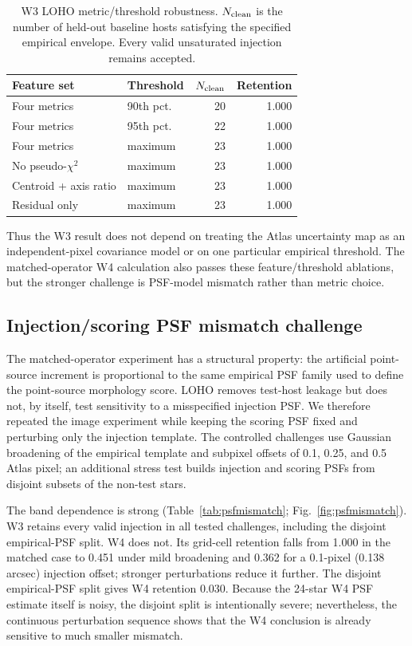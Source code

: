 \documentclass[fleqn,usenatbib]{mnras}
\begin{document}
\begin{table}
\centering
\caption{W3 LOHO metric/threshold robustness. $N_{\rm clean}$ is the number of held-out baseline hosts satisfying the specified empirical envelope. Every valid unsaturated injection remains accepted.}
\label{tab:ablation}
\begin{tabular}{llrr}
\toprule
Feature set & Threshold & $N_{\rm clean}$ & Retention\\
\midrule
Four metrics & 90th pct. & 20 & 1.000\\
Four metrics & 95th pct. & 22 & 1.000\\
Four metrics & maximum & 23 & 1.000\\
No pseudo-$\chi^2$ & maximum & 23 & 1.000\\
Centroid + axis ratio & maximum & 23 & 1.000\\
Residual only & maximum & 23 & 1.000\\
\bottomrule
\end{tabular}
\end{table}

Thus the W3 result does not depend on treating the Atlas uncertainty map as an independent-pixel covariance model or on one particular empirical threshold. The matched-operator W4 calculation also passes these feature/threshold ablations, but the stronger challenge is PSF-model mismatch rather than metric choice.

\subsection{Injection/scoring PSF mismatch challenge}
\label{sec:psf_mismatch}

The matched-operator experiment has a structural property: the artificial point-source increment is proportional to the same empirical PSF family used to define the point-source morphology score. LOHO removes test-host leakage but does not, by itself, test sensitivity to a misspecified injection PSF. We therefore repeated the image experiment while keeping the scoring PSF fixed and perturbing only the injection template. The controlled challenges use Gaussian broadening of the empirical template and subpixel offsets of 0.1, 0.25, and 0.5 Atlas pixel; an additional stress test builds injection and scoring PSFs from disjoint subsets of the non-test stars.

The band dependence is strong (Table~\ref{tab:psfmismatch}; Fig.~\ref{fig:psfmismatch}). W3 retains every valid injection in all tested challenges, including the disjoint empirical-PSF split. W4 does not. Its grid-cell retention falls from 1.000 in the matched case to 0.451 under mild broadening and 0.362 for a 0.1-pixel (0.138 arcsec) injection offset; stronger perturbations reduce it further. The disjoint empirical-PSF split gives W4 retention 0.030. Because the 24-star W4 PSF estimate itself is noisy, the disjoint split is intentionally severe; nevertheless, the continuous perturbation sequence shows that the W4 conclusion is already sensitive to much smaller mismatch.
\end{document}
